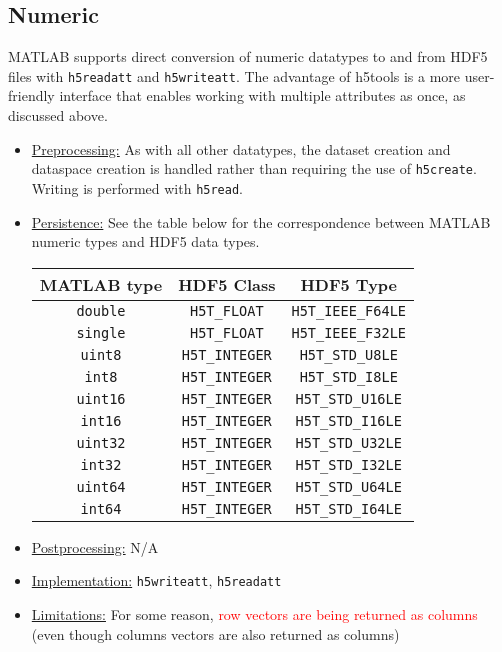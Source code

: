 \documentclass[11pt]{exam}
\newcommand\matfcn[1]{\textcolor{darkteal}{\texttt{#1}}}
\begin{document}
        \subsection{Numeric}
        \noindent MATLAB supports direct conversion of numeric datatypes to and from HDF5 files with \matfcn{h5readatt} and \matfcn{h5writeatt}. The advantage of h5tools is a more user-friendly interface that enables working with multiple attributes as once, as discussed above.
        \begin{itemize}
	        \item \underline{Preprocessing:} As with all other datatypes, the dataset creation and dataspace creation is handled rather than requiring the use of \matfcn{h5create}. Writing is performed with \matfcn{h5read}.
	        \item \underline{Persistence:} See the table below for the correspondence between MATLAB numeric types and HDF5 data types.\\
	        \begin{center}\begin{tabular}{| c | c | c |}
                \hline
                \textbf{MATLAB type} & \textbf{HDF5 Class} & \textbf{HDF5 Type}\\
                \hline
                \texttt{double} & \texttt{H5T\_FLOAT} & \texttt{H5T\_IEEE\_F64LE}\\
                \texttt{single} & \texttt{H5T\_FLOAT} & \texttt{H5T\_IEEE\_F32LE}\\
                \texttt{uint8} & \texttt{H5T\_INTEGER} & \texttt{H5T\_STD\_U8LE}\\
                \texttt{int8} & \texttt{H5T\_INTEGER} & \texttt{H5T\_STD\_I8LE}\\
                \texttt{uint16} & \texttt{H5T\_INTEGER} & \texttt{H5T\_STD\_U16LE}\\
                \texttt{int16} & \texttt{H5T\_INTEGER} & \texttt{H5T\_STD\_I16LE}\\
                \texttt{uint32} & \texttt{H5T\_INTEGER} & \texttt{H5T\_STD\_U32LE}\\
                \texttt{int32} & \texttt{H5T\_INTEGER} & \texttt{H5T\_STD\_I32LE}\\
                \texttt{uint64} & \texttt{H5T\_INTEGER} & \texttt{H5T\_STD\_U64LE}\\
                \texttt{int64} & \texttt{H5T\_INTEGER} & \texttt{H5T\_STD\_I64LE}\\
                \hline
            \end{tabular}\end{center}
	        \item \underline{Postprocessing:} N/A
			\item \underline{Implementation:} \matfcn{h5writeatt}, \matfcn{h5readatt}
			\item \underline{Limitations:} For some reason, \textcolor{red}{row vectors are being returned as columns} (even though columns vectors are also returned as columns)
	    \end{itemize}
\end{document}
